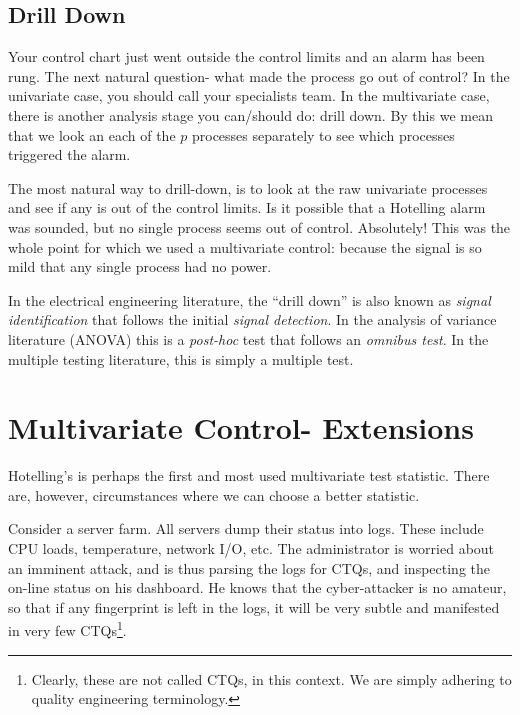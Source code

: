 \subsection{Drill Down}
Your control chart just went outside the control limits and an alarm has been rung.
The next natural question- what made the process go out of control?
In the univariate case, you should call your specialists team. 
In the multivariate case, there is another analysis stage you can/should do: drill down.
By this we mean that we look an each of the $p$ processes separately to see which processes triggered the alarm.

The most natural way to drill-down, is to look at the raw univariate processes and see if any is out of the control limits.
Is it possible that a Hotelling alarm was sounded, but no single process seems out of control.
Absolutely! 
This was the whole point for which we used a multivariate control: because the signal is so mild that any single process had no power.

\begin{extra}
In the electrical engineering literature, the ``drill down'' is also known as \emph{signal identification} that follows the initial \emph{signal detection}. 
In the analysis of variance literature (ANOVA) this is a \emph{post-hoc} test that follows an \emph{omnibus test}.
In the multiple testing literature, this is simply a multiple test. 
\end{extra}





\section[Multivariate extensions]{Multivariate Control- Extensions}

Hotelling's \tsq is perhaps the first and most used multivariate test statistic.
There are, however, circumstances where we can choose a better statistic.


\begin{example}
\label{eg:cyber}
Consider a server farm. 
All servers dump their status into logs. These include CPU loads, temperature, network I/O, etc.
The administrator is worried about an imminent attack, and is thus parsing the logs for CTQs, and inspecting the on-line status on his dashboard.
He knows that the cyber-attacker is no amateur, so that if any fingerprint is left in the logs, it will be very subtle and manifested in very few CTQs\footnote{Clearly, these are not called CTQs, in this context. We are simply adhering to quality engineering terminology.}.
\end{example}



